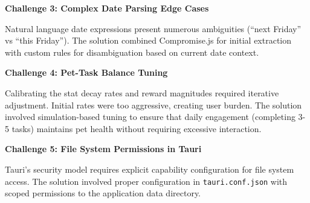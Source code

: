\textbf{Challenge 3: Complex Date Parsing Edge Cases}

Natural language date expressions present numerous ambiguities (``next Friday'' vs ``this Friday''). The solution combined Compromise.js for initial extraction with custom rules for disambiguation based on current date context.

\textbf{Challenge 4: Pet-Task Balance Tuning}

Calibrating the stat decay rates and reward magnitudes required iterative adjustment. Initial rates were too aggressive, creating user burden. The solution involved simulation-based tuning to ensure that daily engagement (completing 3-5 tasks) maintains pet health without requiring excessive interaction.

\textbf{Challenge 5: File System Permissions in Tauri}

Tauri's security model requires explicit capability configuration for file system access. The solution involved proper configuration in \texttt{tauri.conf.json} with scoped permissions to the application data directory.

